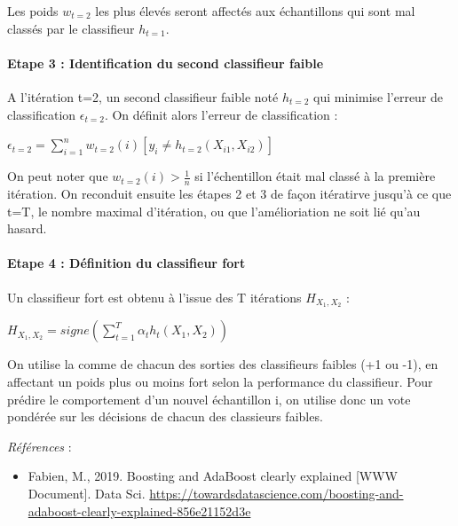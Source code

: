 \documentclass[
]{article}
\providecommand{\tightlist}{%
  \setlength{\itemsep}{0pt}\setlength{\parskip}{0pt}}
\begin{document}
Les poids \(w_{t=2}\) les plus élevés seront affectés aux échantillons
qui sont mal classés par le classifieur \(h_{t=1}\).

\hypertarget{etape-3-identification-du-second-classifieur-faible}{%
\paragraph{Etape 3 : Identification du second classifieur
faible}\label{etape-3-identification-du-second-classifieur-faible}}

A l'itération t=2, un second classifieur faible noté \(h_{t=2}\) qui
minimise l'erreur de classification \(\epsilon_{t=2}\). On définit alors
l'erreur de classification :

\begin{center}
  $\epsilon_{t=2}=\sum_{i=1}^nw_{t=2}(i)[y_i\ne h_{t=2}(X_{i1},X_{i2})]$
\end{center}

On peut noter que \(w_{t=2}(i)>\frac{1}{n}\) si l'échentillon était mal
classé à la première itération. On reconduit ensuite les étapes 2 et 3
de façon itératirve jusqu'à ce que t=T, le nombre maximal d'itération,
ou que l'amélioriation ne soit lié qu'au hasard.

\hypertarget{etape-4-duxe9finition-du-classifieur-fort}{%
\paragraph{Etape 4 : Définition du classifieur
fort}\label{etape-4-duxe9finition-du-classifieur-fort}}

Un classifieur fort est obtenu à l'issue des T itérations
\(H_{X_1,X_2}\) :

\begin{center}
  $H_{X_1,X_2}=signe(\sum_{t=1}^T\alpha_th_t(X_1,X_2))$
\end{center}

On utilise la comme de chacun des sorties des classifieurs faibles (+1
ou -1), en affectant un poids plus ou moins fort selon la performance du
classifieur. Pour prédire le comportement d'un nouvel échantillon i, on
utilise donc un vote pondérée sur les décisions de chacun des classieurs
faibles.

\emph{Références} :

\begin{itemize}
\tightlist
\item
  Fabien, M., 2019. Boosting and AdaBoost clearly explained {[}WWW
  Document{]}. Data Sci.
  \url{https://towardsdatascience.com/boosting-and-adaboost-clearly-explained-856e21152d3e}
\end{itemize}
\end{document}
